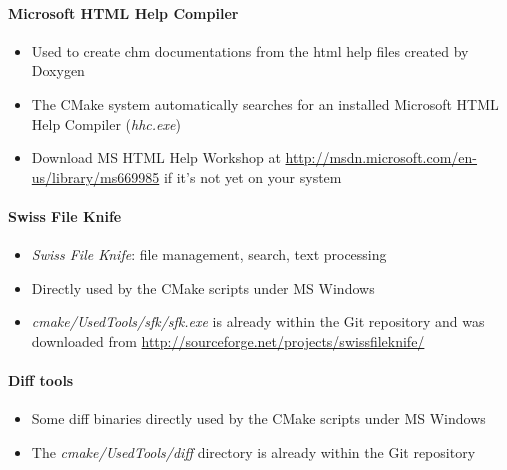 \paragraph{Microsoft HTML Help Compiler}
\begin{itemize}
\item{Used to create chm documentations from the html help files created by Doxygen}
\item{The CMake system automatically searches for an installed Microsoft HTML Help Compiler (\emph{hhc.exe})}
\item{Download MS HTML Help Workshop at \url{http://msdn.microsoft.com/en-us/library/ms669985} if it's not yet on your system}
\end{itemize}


\paragraph{Swiss File Knife}
\begin{itemize}
\item{\emph{Swiss File Knife}: file management, search, text processing}
\item{Directly used by the CMake scripts under MS Windows}
\item{\emph{cmake/UsedTools/sfk/sfk.exe} is already within the Git repository and was downloaded from \url{http://sourceforge.net/projects/swissfileknife/}}
\end{itemize}


\paragraph{Diff tools}
\begin{itemize}
\item{Some diff binaries directly used by the CMake scripts under MS Windows}
\item{The \emph{cmake/UsedTools/diff} directory is already within the Git repository}
\end{itemize}




